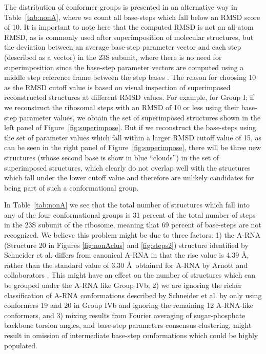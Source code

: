 The distribution  of conformer groups  is presented in  an alternative
way in Table~\ref{tab:nonA}, where  we count all base-steps which fall
below an  RMSD score  of 10.  It  is important  to note here  that the
computed  RMSD is  not an  all-atom RMSD,  as is  commonly  used after
superimposition of molecular structures,  but the deviation between an
average  base-step parameter  vector  and each  step  (described as  a
vector) in the 23S subunit, where there is no need for superimposition
since the base-step parameter vectors are computed using a middle step
reference frame between the  step bases \cite{lu2003}.  The reason for
choosing 10 as the RMSD cutoff  value is based on visual inspection of
superimposed  reconstructed structures at  different RMSD  values. For
example, for  Group I; if we  reconstruct the ribosomal  steps with an
RMSD of 10  or less using their base-step  parameter values, we obtain
the  set  of  superimposed  structures  shown in  the  left  panel  of
Figure~\ref{fig:superimpose}.   But if  we reconstruct  the base-steps
using  the set of  parameter values  which fall  within a  larger RMSD
cutoff  value  of   15,  as  can  be  seen  in   the  right  panel  of
Figure~\ref{fig:superimpose},  there  will  be  three  new  structures
(whose  second  base  is  show  in  blue ``clouds'')  in  the  set  of
superimposed structures,  which clearly do  not overlap well  with the
structures which fall  under the lower cutoff value  and therefore are
unlikely candidates for being part of such a conformational group.
  
In  Table~\ref{tab:nonA} we see  that the  total number  of structures
which fall into any of the four conformational groups is 31 percent of
the total number of steps in  the 23S subunit of the ribosome, meaning
that  69 percent  of base-steps  are not  recognized. We  believe this
problem might be  due to three factors: 1) the  A-RNA (Structure 20 in
Figures \ref{fig:nonAclus}  and \ref{fig:steps2}) structure identified
by Schneider  et al.   differs from canonical  A-RNA in that  the rise
value is 4.39 \AA, rather than the standard value of 3.30 \AA~obtained
for A-RNA  by Arnott and collaborators  \cite{arnott1973}.  This might
have an effect on the number  of structures which can be grouped under
the A-RNA like Group IVb; 2) we are ignoring the richer classification
of    A-RNA   conformations    described   by    Schneider    et   al.
\cite{schneider2004} by only  using conformers 19 and 20  in Group IVb
and  ignoring the remaining  12 A-RNA-like  conformers, and  3) mixing
results  from Fourier  averaging of  sugar-phosphate  backbone torsion
angles, and base-step parameters consensus clustering, might result in
omission of intermediate base-step conformations which could be highly
populated.

